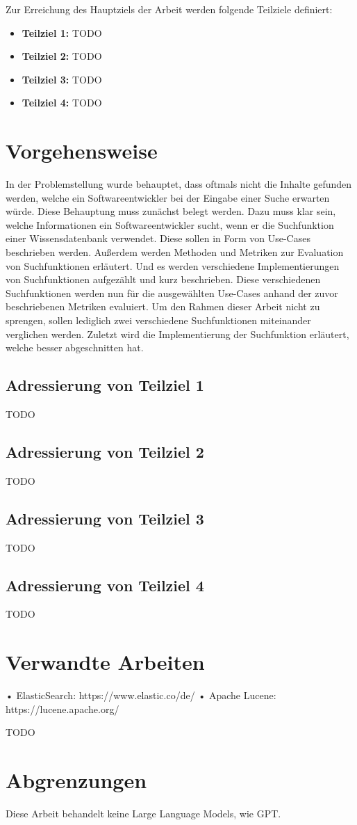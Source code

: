 Zur Erreichung des Hauptziels der Arbeit werden folgende Teilziele definiert:

\begin{itemize}
   \item \textbf{Teilziel 1:}
   TODO  
   \item \textbf{Teilziel 2:}
   TODO  
   \item \textbf{Teilziel 3:}
   TODO  
   \item \textbf{Teilziel 4:}
   TODO  
\end{itemize}


%
%
%
\section{Vorgehensweise}
In der Problemstellung wurde behauptet, dass oftmals nicht die Inhalte gefunden werden, welche ein Softwareentwickler bei der Eingabe einer Suche erwarten würde. Diese Behauptung muss zunächst belegt werden. Dazu muss klar sein, welche Informationen ein Softwareentwickler sucht, wenn er die Suchfunktion einer Wissensdatenbank verwendet. Diese sollen in Form von Use-Cases beschrieben werden. Außerdem werden Methoden und Metriken zur Evaluation von Suchfunktionen erläutert. Und es werden verschiedene Implementierungen von Suchfunktionen aufgezählt und kurz beschrieben. Diese verschiedenen Suchfunktionen werden nun für die ausgewählten Use-Cases anhand der zuvor beschriebenen Metriken evaluiert. Um den Rahmen dieser Arbeit nicht zu sprengen, sollen lediglich zwei verschiedene Suchfunktionen miteinander verglichen werden. Zuletzt wird die Implementierung der Suchfunktion erläutert, welche besser abgeschnitten hat.

\subsection*{Adressierung von Teilziel 1}
TODO

\subsection*{Adressierung von Teilziel 2}
TODO

\subsection*{Adressierung von Teilziel 3}
TODO

\subsection*{Adressierung von Teilziel 4}
TODO

\section{Verwandte Arbeiten}
•	ElasticSearch: https://www.elastic.co/de/
•	Apache Lucene: https://lucene.apache.org/

TODO


\section{Abgrenzungen}
Diese Arbeit behandelt keine Large Language Models, wie GPT.